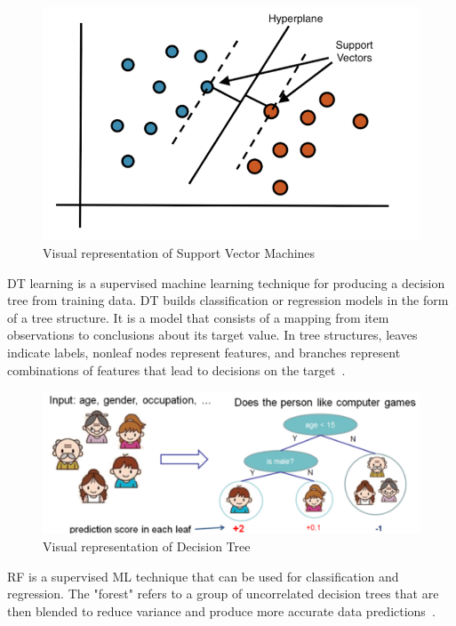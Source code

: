 \begin{figure}[htbp]
    \centering
    \includegraphics[width=0.65\linewidth]{Chapters/Figures/svm.png}
    \caption{Visual representation of Support Vector Machines~\cite{MaquinaExplicada}}
    \label{fig:svm}
\end{figure}

\gls{DT} learning is a supervised machine learning technique for producing a decision tree from training data. \gls{DT} builds classification or regression models in the form of a tree structure. It is a model that consists of a mapping from item observations to conclusions about its target value. In tree structures, leaves indicate labels, nonleaf nodes represent features, and branches represent combinations of features that lead to decisions on the target~\cite{Tan2015CodeQuality}.

\begin{figure}[htbp]
    \centering
    \includegraphics[width=0.70\linewidth]{Chapters/Figures/dt.png}
    \caption{Visual representation of Decision Tree~\cite{Rai2018XGBoostScience}}
    \label{fig:dt}
\end{figure}

\gls{RF} is a supervised \gls{ML} technique that can be used for classification and regression. The "forest" refers to a group of uncorrelated decision trees that are then blended to reduce variance and produce more accurate data predictions~\cite{2020WhatIBM}.

